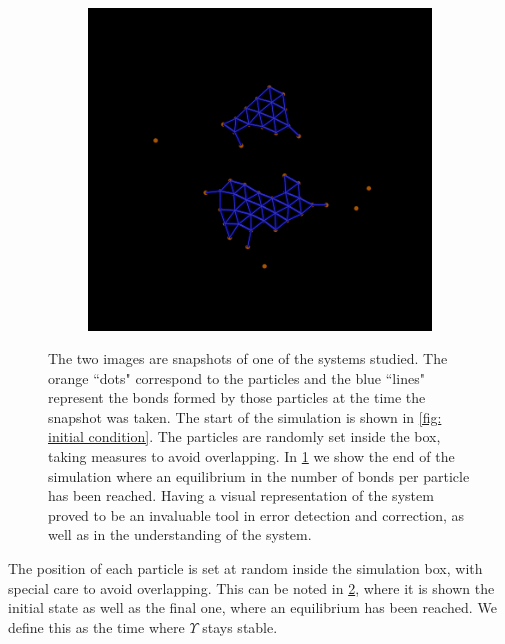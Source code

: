 \documentclass[../../main.tex]{subfiles}
\begin{document}
\begin{figure}[h]
\begin{subfigure}[b]{0.475\textwidth}
                \includegraphics[width=\textwidth]{Figures/end_np.png}
                \caption{}
                \label{fig: end of simul vmd}
            \end{subfigure}
            \caption{The two images are snapshots of one of the systems studied. The orange ``dots" correspond to the particles and the blue ``lines" represent the bonds formed by those particles at the time the snapshot was taken. The start of the simulation is shown in \cref{fig: initial condition}. The particles are randomly set inside the box, taking measures to avoid overlapping. In \cref{fig: end of simul vmd} we show the end of the simulation where an equilibrium in the number of bonds per particle has been reached. Having a visual representation of the system proved to be an invaluable tool in error detection and correction, as well as in the understanding of the system.}
            \label{fig: vmd screen}
        \end{figure}
        
    The position of each particle is set at random inside the simulation box, with special care to avoid overlapping. This can be noted in \cref{fig: vmd screen}, where it is shown the initial state as well as the final one, where an equilibrium has been reached. We define this as the time where $\Upsilon$ stays stable. 
        
\end{document}
